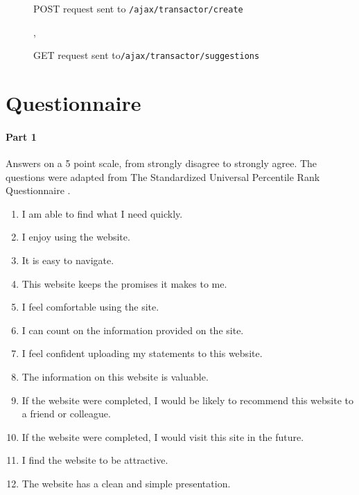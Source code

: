\begin{appendices}
\begin{figure}
\begin{minipage}{.4\textwidth}
    \centering
    
    \caption{POST request sent to \lstinline{/ajax/transactor/map}}
    \label{fig:json-map-example}
\end{minipage}%
\hspace{.1\textwidth}
\begin{minipage}{.4\textwidth}
    \centering
    
    \caption{POST request sent to \lstinline{/ajax/transactor/create}}
    \label{fig:json-create-example}
\end{minipage}    
\end{figure}

\begin{figure}
    
    \caption{GET request sent to\lstinline{/ajax/transactor/suggestions}}
    \label{fig:json-post-example},
\end{figure}

\chapter{Questionnaire} \label{app:questionnaire}

\subsubsection{Part 1}
Answers on a 5 point scale, from strongly disagree to strongly agree. The questions were adapted from The Standardized Universal Percentile Rank Questionnaire \parencite{sauro2011standardized}.

\begin{enumerate}
\item I am able to find what I need quickly.
\item I enjoy using the website.
\item It is easy to navigate.
\item This website keeps the promises it makes to me.
\item I feel comfortable using the site.
\item I can count on the information provided on the site.
\item I feel confident uploading my statements to this website.
\item The information on this website is valuable.
\item If the website were completed, I would be likely to recommend this website to a friend or colleague.
\item If the website were completed, I would visit this site in the future.
\item I find the website to be attractive.
\item The website has a clean and simple presentation.
\end{enumerate}


\end{appendices}
